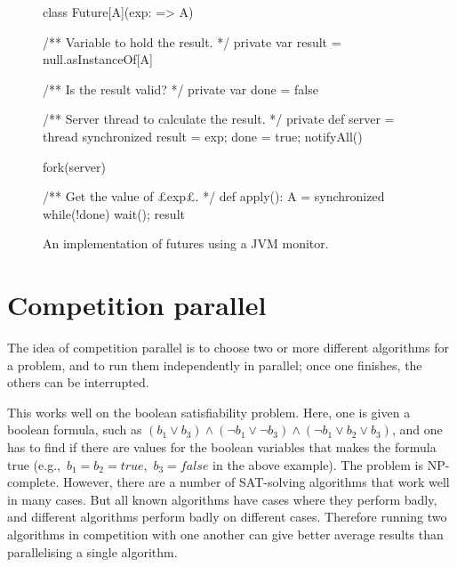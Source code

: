 
\begin{figure}
\begin{scala}
class Future[A](exp: => A){
  /** Variable to hold the result. */
  private var result = null.asInstanceOf[A]

  /** Is the result valid? */
  private var done = false

  /** Server thread to calculate the result. */
  private def server = thread{
    synchronized{ result = exp; done = true; notifyAll() }
  }

  fork(server)

  /** Get the value of £exp£. */
  def apply(): A = synchronized{ while(!done) wait(); result }
}
\end{scala}
\caption{An implementation of futures using a JVM monitor.}
\label{fig:future}
\end{figure}



\section{Competition parallel}

The idea of competition parallel is to choose two
or more different algorithms for a problem, and to run them independently in
parallel; once one finishes, the others can be interrupted.

This works well on the boolean satisfiability problem.  Here, one is given a
boolean formula, such as $(b_1 \lor b_3) \land (\lnot b_1 \lor \lnot b_3)
\land (\lnot b_1 \lor b_2 \lor b_3)$, and one has to find if there are values
for the boolean variables that makes the formula true (e.g.,~$b_1 = b_2 =
true$,\, $b_3 = false$ in the above example).  The problem is NP-complete.
However, there are a number of SAT-solving algorithms that work well in many
cases.  But all known algorithms have cases where they perform badly, and
different algorithms perform badly on different cases.  Therefore running two
algorithms in competition with one another can give better average results
than parallelising a single algorithm.



